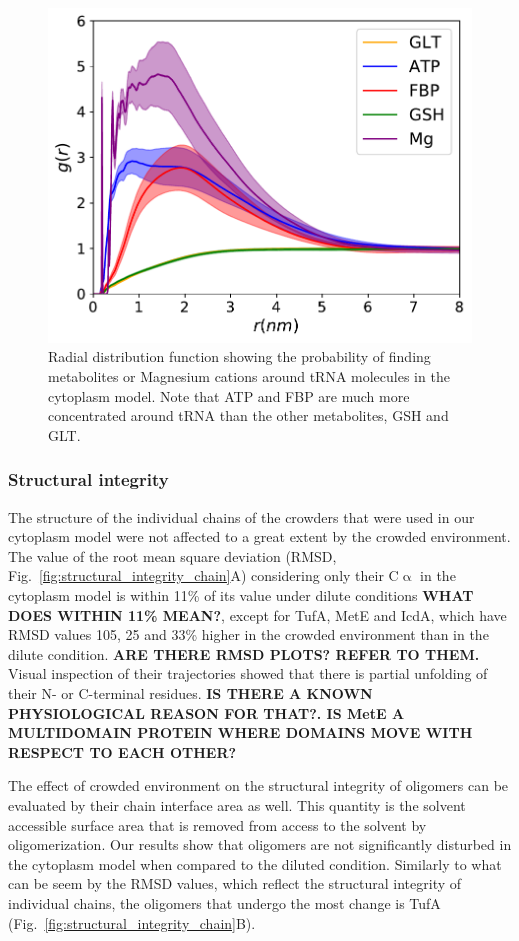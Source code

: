 \documentclass[journal=jcisd8,manuscript=article]{achemso}
\begin{document}
\begin{figure}[H]
\includegraphics[scale=0.5]{rdf_RNA_metabolites.pdf}
\caption{Radial distribution function showing the probability of
  finding metabolites or Magnesium cations around tRNA molecules in
  the cytoplasm model. Note that ATP and FBP are much more
  concentrated around tRNA than the other metabolites, GSH and GLT.}
\label{fig:tRNA_aggregation}
\end{figure}


\subsubsection{Structural integrity}
The structure of the individual chains of the crowders that were used
in our cytoplasm model were not affected to a great extent by the
crowded environment. The value of the root mean square deviation
(RMSD, Fig.~\ref{fig:structural_integrity_chain}A) considering only
their C$\upalpha$ in the cytoplasm model is within 11\% of its value
under dilute conditions {\bf WHAT DOES WITHIN 11\% MEAN?}, except for
TufA, MetE and IcdA, which have RMSD values 105, 25 and 33\% higher in
the crowded environment than in the dilute condition. {\bf ARE THERE
  RMSD PLOTS? REFER TO THEM.} Visual inspection of their trajectories
showed that there is partial unfolding of their N- or C-terminal
residues. {\bf IS THERE A KNOWN PHYSIOLOGICAL REASON FOR THAT?. IS
  MetE A MULTIDOMAIN PROTEIN WHERE DOMAINS MOVE WITH RESPECT TO EACH
  OTHER?}

The effect of crowded environment on the structural integrity of
oligomers can be evaluated by their chain interface area as well. This
quantity is the solvent accessible surface area that is removed from
access to the solvent by oligomerization. Our results show that
oligomers are not significantly disturbed in the cytoplasm model when
compared to the diluted condition. Similarly to what can be seem by
the RMSD values, which reflect the structural integrity of individual
chains, the oligomers that undergo the most change is TufA
(Fig.~\ref{fig:structural_integrity_chain}B).
\end{document}
